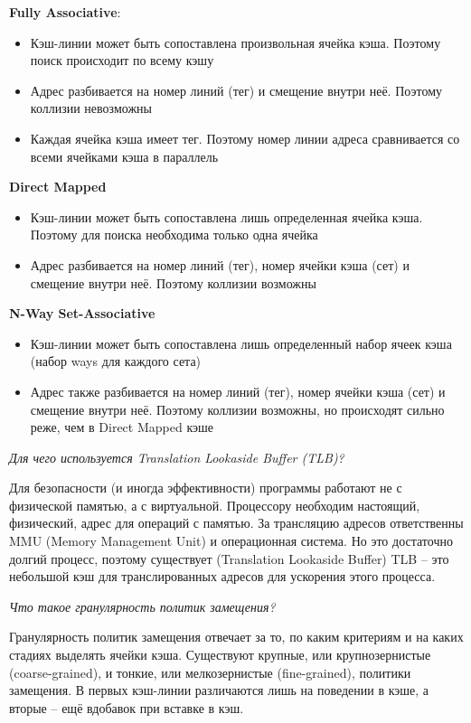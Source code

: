 	\textbf{Fully Associative}:
	\begin{itemize}
		\item Кэш-линии может быть сопоставлена произвольная ячейка кэша. Поэтому поиск происходит по всему кэшу
		\item Адрес разбивается на номер линий (тег) и смещение внутри неё. Поэтому коллизии невозможны
		\item Каждая ячейка кэша имеет тег. Поэтому номер линии адреса сравнивается со всеми ячейками кэша в параллель
	\end{itemize}
	
	\textbf{Direct Mapped}
	\begin{itemize}
		\item Кэш-линии может быть сопоставлена лишь определенная ячейка кэша. Поэтому для поиска необходима только одна ячейка
		\item Адрес разбивается на номер линий (тег), номер ячейки кэша (сет) и смещение внутри неё. Поэтому коллизии возможны
	\end{itemize}


	\textbf{N-Way Set-Associative}
	\begin{itemize}
		\item Кэш-линии может быть сопоставлена лишь определенный набор ячеек кэша (набор ways для каждого сета)
		\item Адрес также разбивается на номер линий (тег), номер ячейки кэша (сет) и смещение внутри неё. Поэтому коллизии возможны, но происходят сильно реже, чем в Direct Mapped кэше
	\end{itemize}
	
	\textit{Для чего используется Translation Lookaside Buffer (TLB)?}
	
	Для безопасности (и иногда эффективности) программы работают не с физической памятью, а с виртуальной. Процессору необходим настоящий, физический, адрес для операций с памятью. За трансляцию адресов ответственны MMU (Memory Management Unit) и операционная система. Но это достаточно долгий процесс, поэтому существует (Translation Lookaside Buffer) TLB -- это небольшой кэш для транслированных адресов для ускорения этого процесса.
	
	\textit{Что такое гранулярность политик замещения?}
	
	Гранулярность политик замещения отвечает за то, по каким критериям и на каких стадиях выделять ячейки кэша. Существуют крупные, или крупнозернистые (coarse-grained), и тонкие, или мелкозернистые (fine-grained), политики замещения. В первых кэш-линии различаются лишь на поведении в кэше, а вторые -- ещё вдобавок при вставке в кэш.
	
